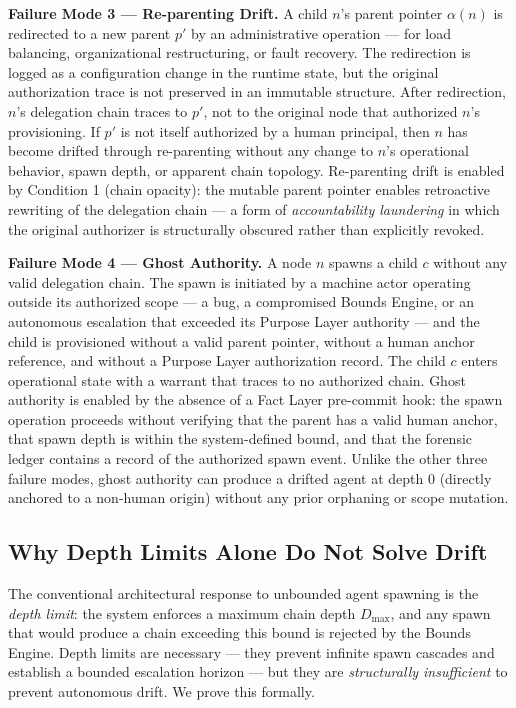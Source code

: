 \documentclass[12pt]{article}
\begin{document}
\medskip
\noindent\textbf{Failure Mode 3 — Re-parenting Drift.}
A child $n$'s parent pointer $\alpha(n)$ is redirected to a new parent $p'$ by an administrative operation — for load balancing, organizational restructuring, or fault recovery. The redirection is logged as a configuration change in the runtime state, but the original authorization trace is not preserved in an immutable structure. After redirection, $n$'s delegation chain traces to $p'$, not to the original node that authorized $n$'s provisioning. If $p'$ is not itself authorized by a human principal, then $n$ has become drifted through re-parenting without any change to $n$'s operational behavior, spawn depth, or apparent chain topology. Re-parenting drift is enabled by Condition 1 (chain opacity): the mutable parent pointer enables retroactive rewriting of the delegation chain — a form of \emph{accountability laundering} in which the original authorizer is structurally obscured rather than explicitly revoked.

\medskip
\noindent\textbf{Failure Mode 4 — Ghost Authority.}
A node $n$ spawns a child $c$ without any valid delegation chain. The spawn is initiated by a machine actor operating outside its authorized scope — a bug, a compromised Bounds Engine, or an autonomous escalation that exceeded its Purpose Layer authority — and the child is provisioned without a valid parent pointer, without a human anchor reference, and without a Purpose Layer authorization record. The child $c$ enters operational state with a warrant that traces to no authorized chain. Ghost authority is enabled by the absence of a Fact Layer pre-commit hook: the spawn operation proceeds without verifying that the parent has a valid human anchor, that spawn depth is within the system-defined bound, and that the forensic ledger contains a record of the authorized spawn event. Unlike the other three failure modes, ghost authority can produce a drifted agent at depth $0$ (directly anchored to a non-human origin) without any prior orphaning or scope mutation.

\subsection{Why Depth Limits Alone Do Not Solve Drift}
\label{sec:drift-depth-limits}

The conventional architectural response to unbounded agent spawning is the \emph{depth limit}: the system enforces a maximum chain depth $D_{\max}$, and any spawn that would produce a chain exceeding this bound is rejected by the Bounds Engine. Depth limits are necessary — they prevent infinite spawn cascades and establish a bounded escalation horizon — but they are \emph{structurally insufficient} to prevent autonomous drift. We prove this formally.
\end{document}
